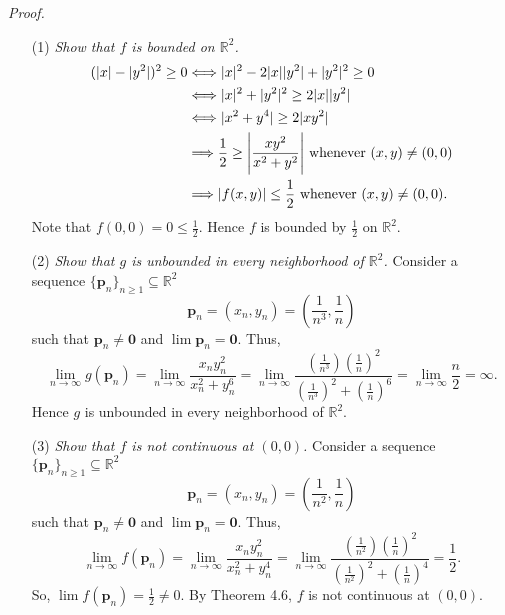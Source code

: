 \documentclass{article}
\begin{document}
\emph{Proof.}
\begin{enumerate}
\item[(1)]
\emph{Show that $f$ is bounded on $\mathbb{R}^2$.}
\begin{align*}
  (|x| - |y^2|)^2 \geq 0
  &\Longleftrightarrow
  |x|^2 - 2|x||y^2| + |y^2|^2 \geq 0 \\
  &\Longleftrightarrow
  |x|^2 + |y^2|^2 \geq 2|x||y^2| \\
  &\Longleftrightarrow
  |x^2 + y^4| \geq 2|xy^2| \\
  &\Longrightarrow
  \frac{1}{2} \geq \abs{ \frac{xy^2}{x^2+y^2} } \text{ whenever } (x,y) \neq (0,0) \\
  &\Longrightarrow
  |f(x,y)| \leq \frac{1}{2} \text{ whenever } (x,y) \neq (0,0).
\end{align*}
Note that $f(0,0) = 0 \leq \frac{1}{2}$.
Hence $f$ is bounded by $\frac{1}{2}$ on $\mathbb{R}^2$.

\item[(2)]
\emph{Show that $g$ is unbounded in every neighborhood of $\mathbb{R}^2$.}
Consider
a sequence $\{\mathbf{p}_n\}_{n \geq 1} \subseteq \mathbb{R}^2$
\[
  \mathbf{p}_n
  = (x_n, y_n)
  = \left( \frac{1}{n^3}, \frac{1}{n} \right)
\]
such that $\mathbf{p}_n \neq \mathbf{0}$ and $\lim \mathbf{p}_n = \mathbf{0}$.
Thus,
\[
  \lim_{n \to \infty} g(\mathbf{p}_n)
  = \lim_{n \to \infty} \frac{ x_n y_n^2 }{ x_n^2 + y_n^6 }
  = \lim_{n \to \infty} \frac{ (\frac{1}{n^3}) (\frac{1}{n})^2 }
    { (\frac{1}{n^3})^2 + (\frac{1}{n})^6 }
  = \lim_{n \to \infty} \frac{n}{2}
  = \infty.
\]
Hence $g$ is unbounded in every neighborhood of $\mathbb{R}^2$.

\item[(3)]
\emph{Show that $f$ is not continuous at $(0,0)$.}
Consider
a sequence $\{\mathbf{p}_n\}_{n \geq 1} \subseteq \mathbb{R}^2$
\[
  \mathbf{p}_n
  = (x_n, y_n)
  = \left( \frac{1}{n^2}, \frac{1}{n} \right)
\]
such that $\mathbf{p}_n \neq \mathbf{0}$ and $\lim \mathbf{p}_n = \mathbf{0}$.
Thus,
\[
  \lim_{n \to \infty} f(\mathbf{p}_n)
  = \lim_{n \to \infty} \frac{ x_n y_n^2 }{ x_n^2 + y_n^4 }
  = \lim_{n \to \infty} \frac{ (\frac{1}{n^2}) (\frac{1}{n})^2 }
    { (\frac{1}{n^2})^2 + (\frac{1}{n})^4 }
  = \frac{1}{2}.
\]
So, $\lim f(\mathbf{p}_n) = \frac{1}{2} \neq 0$.
By Theorem 4.6, $f$ is not continuous at $(0,0)$.


\end{enumerate}
\end{document}
